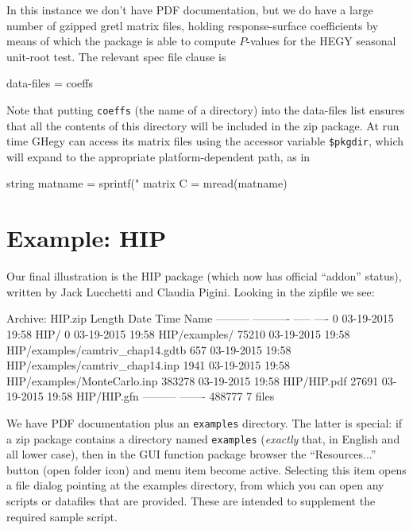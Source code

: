 \documentclass[oneside]{book}
\begin{document}
In this instance we don't have PDF documentation, but we do have a
large number of gzipped gretl matrix files, holding response-surface
coefficients by means of which the package is able to compute
$P$-values for the HEGY seasonal unit-root test. The relevant
spec file clause is
%
\begin{code}
data-files = coeffs
\end{code}
%
Note that putting \texttt{coeffs} (the name of a directory) into the
data-files list ensures that all the contents of this directory will
be included in the zip package. At run time \textsf{GHegy} can access
its matrix files using the accessor variable
\verb|$pkgdir|, which will expand to the appropriate
platform-dependent path, as in
%
\begin{code}
string matname = sprintf("%
matrix C = mread(matname)
\end{code}

\section{Example: \textsf{HIP}}
\label{sec:HIP}

Our final illustration is the \textsf{HIP} package (which now has
official ``addon'' status), written by Jack Lucchetti and Claudia
Pigini. Looking in the zipfile we see:

\begin{code}
Archive:  HIP.zip
  Length      Date    Time    Name
---------  ---------- -----   ----
        0  03-19-2015 19:58   HIP/
        0  03-19-2015 19:58   HIP/examples/
    75210  03-19-2015 19:58   HIP/examples/camtriv_chap14.gdtb
      657  03-19-2015 19:58   HIP/examples/camtriv_chap14.inp
     1941  03-19-2015 19:58   HIP/examples/MonteCarlo.inp
   383278  03-19-2015 19:58   HIP/HIP.pdf
    27691  03-19-2015 19:58   HIP/HIP.gfn
---------                     -------
   488777                     7 files
\end{code}

We have PDF documentation plus an \texttt{examples} directory. The
latter is special: if a zip package contains a directory named
\texttt{examples} (\textit{exactly} that, in English and all lower
case), then in the GUI function package browser the ``Resources...''
button (open folder icon) and menu item become active. Selecting this
item opens a file dialog pointing at the examples directory, from
which you can open any scripts or datafiles that are provided. These
are intended to supplement the required sample script.



\end{document}
